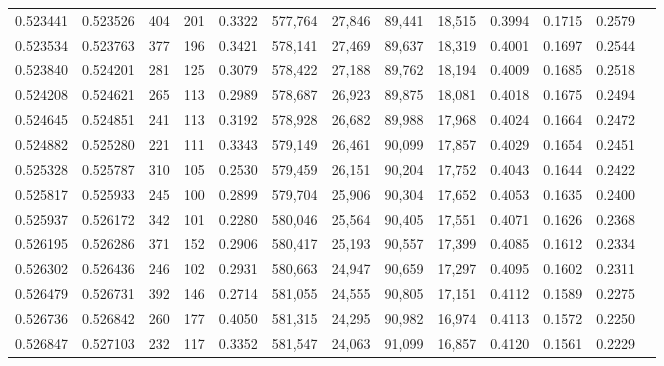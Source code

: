 \begin{tabular}{rrrrrrrrrrrrr}
0.523441 & 0.523526 &   404 &   201 &                                     0.3322 & 577,764 &  27,846 &  89,441 &  18,515 & 0.3994 & 0.1715 & 0.2579 \\
0.523534 & 0.523763 &   377 &   196 &                                     0.3421 & 578,141 &  27,469 &  89,637 &  18,319 & 0.4001 & 0.1697 & 0.2544 \\
0.523840 & 0.524201 &   281 &   125 &                                     0.3079 & 578,422 &  27,188 &  89,762 &  18,194 & 0.4009 & 0.1685 & 0.2518 \\
0.524208 & 0.524621 &   265 &   113 &                                     0.2989 & 578,687 &  26,923 &  89,875 &  18,081 & 0.4018 & 0.1675 & 0.2494 \\
0.524645 & 0.524851 &   241 &   113 &                                     0.3192 & 578,928 &  26,682 &  89,988 &  17,968 & 0.4024 & 0.1664 & 0.2472 \\
0.524882 & 0.525280 &   221 &   111 &                                     0.3343 & 579,149 &  26,461 &  90,099 &  17,857 & 0.4029 & 0.1654 & 0.2451 \\
0.525328 & 0.525787 &   310 &   105 &                                     0.2530 & 579,459 &  26,151 &  90,204 &  17,752 & 0.4043 & 0.1644 & 0.2422 \\
0.525817 & 0.525933 &   245 &   100 &                                     0.2899 & 579,704 &  25,906 &  90,304 &  17,652 & 0.4053 & 0.1635 & 0.2400 \\
0.525937 & 0.526172 &   342 &   101 &                                     0.2280 & 580,046 &  25,564 &  90,405 &  17,551 & 0.4071 & 0.1626 & 0.2368 \\
0.526195 & 0.526286 &   371 &   152 &                                     0.2906 & 580,417 &  25,193 &  90,557 &  17,399 & 0.4085 & 0.1612 & 0.2334 \\
0.526302 & 0.526436 &   246 &   102 &                                     0.2931 & 580,663 &  24,947 &  90,659 &  17,297 & 0.4095 & 0.1602 & 0.2311 \\
0.526479 & 0.526731 &   392 &   146 &                                     0.2714 & 581,055 &  24,555 &  90,805 &  17,151 & 0.4112 & 0.1589 & 0.2275 \\
0.526736 & 0.526842 &   260 &   177 &                                     0.4050 & 581,315 &  24,295 &  90,982 &  16,974 & 0.4113 & 0.1572 & 0.2250 \\
0.526847 & 0.527103 &   232 &   117 &                                     0.3352 & 581,547 &  24,063 &  91,099 &  16,857 & 0.4120 & 0.1561 & 0.2229 \\

\end{tabular}
